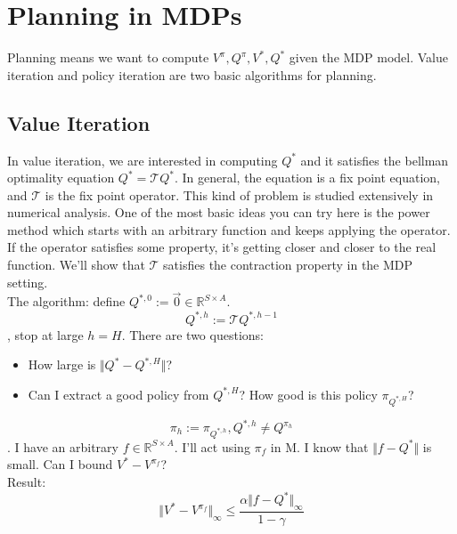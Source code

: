 \documentclass{report}
\begin{document}
\section{Planning in MDPs}
Planning means we want to compute $V^{\pi},Q^{\pi},V^{*},Q^{*}$ given the MDP model. Value iteration and policy iteration are two basic algorithms for planning.
\subsection{Value Iteration}
In value iteration, we are interested in computing $Q^*$ and it satisfies the bellman optimality equation $Q^*=\mathcal{T}Q^*$. In general, the equation is a fix point equation, and $\mathcal{T}$ is the fix point operator. This kind of problem is studied extensively in numerical analysis. One of the most  basic ideas you can try here is the power method which starts with an arbitrary function and keeps applying the operator. If the operator satisfies some property, it's getting closer and closer to the real function. We'll show that $\mathcal{T}$ satisfies the contraction property in the MDP setting.\\
The algorithm: define $Q^{*,0}:=\Vec{0}\in \mathbb{R}^{S\times A}$. \[Q^{*,h}:=\mathcal{T}Q^{*,h-1}\], stop at large $h=H$. There are two questions:
\begin{itemize}
    \item How large is $\Vert Q^*-Q^{*, H}\Vert$?
    \item Can I extract a good policy from $Q^{*, H}$? How good is this policy $\pi_{Q^{*, H}}$?
\end{itemize}
\[\pi_h := \pi_{Q^{*,h}}, Q^{*,h} \neq Q^{\pi_h}\].
I have an arbitrary $f\in \mathbb{R}^{S\times A}$. I'll act using $\pi_f$ in M. I know that $\Vert f-Q^*\Vert$ is small. Can I bound $V^{*}-V^{\pi_f}$?\\
Result: \[\Vert  V^*-V^{ \pi_f} \Vert_{\infty} \leq \frac{\alpha \Vert f-Q^{*}\Vert_{\infty}}{1-\gamma}\]\cite{Singh1994AnFunctions}
\end{document}
